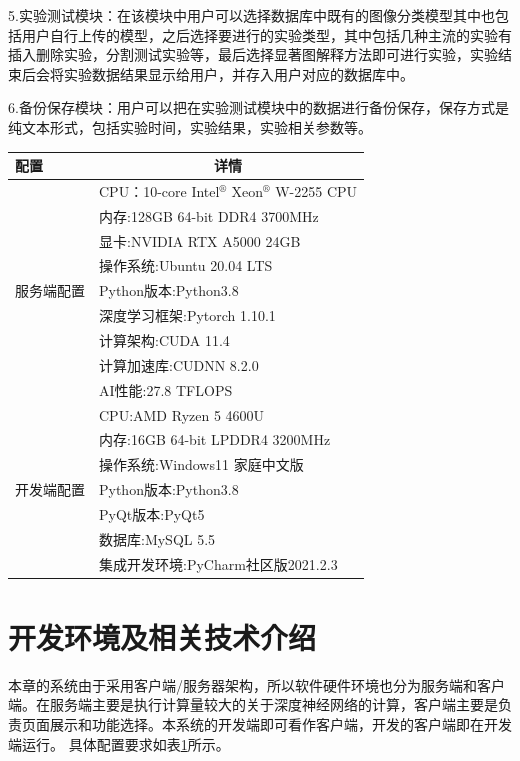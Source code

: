  5.实验测试模块：在该模块中用户可以选择数据库中既有的图像分类模型其中也包括用户自行上传的模型，之后选择要进行的实验类型，其中包括几种主流的实验有插入删除实验，分割测试实验等，最后选择显著图解释方法即可进行实验，实验结束后会将实验数据结果显示给用户，并存入用户对应的数据库中。
 
 6.备份保存模块：用户可以把在实验测试模块中的数据进行备份保存，保存方式是纯文本形式，包括实验时间，实验结果，实验相关参数等。

\begin{table}
	\renewcommand{\arraystretch}{1.5}
	\centering
	\label{tab:sys}
	\begin{tabular}{p{4cm}p{8cm}} 
		\hline
		配置                     & \multicolumn{1}{c}{详情}             \\ 
		\hline
		\multirow{9}{*}{服务端配置} & CPU：10-core Intel$^\circledR$ Xeon$^\circledR$ W-2255 CPU  \\
		& 内存:128GB 64-bit DDR4 3700MHz       \\
		& 显卡:NVIDIA RTX A5000 24GB           \\
		& 操作系统:Ubuntu 20.04 LTS              \\
		& Python版本:Python3.8                 \\
		& 深度学习框架:Pytorch 1.10.1              \\
		& 计算架构:CUDA 11.4                     \\
		& 计算加速库:CUDNN 8.2.0                  \\
		& AI性能:27.8 TFLOPS                   \\ 
		\hline
		\multirow{7}{*}{开发端配置} & CPU:AMD Ryzen 5 4600U              \\
		& 内存:16GB 64-bit LPDDR4 3200MHz      \\
		& 操作系统:Windows11 家庭中文版               \\
		& Python版本:Python3.8                 \\
		& PyQt版本:PyQt5                       \\
		& 数据库:MySQL 5.5                      \\
		& 集成开发环境:PyCharm社区版2021.2.3            \\
		\hline
	\end{tabular}
\end{table}

 
\section{开发环境及相关技术介绍}
本章的系统由于采用客户端/服务器架构，所以软件硬件环境也分为服务端和客户端。在服务端主要是执行计算量较大的关于深度神经网络的计算，客户端主要是负责页面展示和功能选择。本系统的开发端即可看作客户端，开发的客户端即在开发端运行。  具体配置要求如表\ref{tab:sys}所示。



